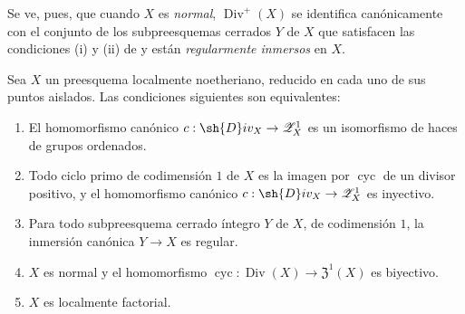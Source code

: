 \begin{env}[21.7.3.1]
\label{IV.21.7.3.1}
Se ve, pues, que cuando $X$ es \emph{normal}, $\operatorname{Div}^+(X)$ se identifica canónicamente con el conjunto de los subpreesquemas cerrados $Y$ de $X$ que satisfacen las condiciones (i) y (ii) de  y están \emph{regularmente inmersos} en $X$.
\end{env}

\begin{proposition}[21.7.4]
\label{IV.21.7.4}
Sea $X$ un preesquema localmente noetheriano, reducido en cada uno de sus puntos aislados.
Las condiciones siguientes son equivalentes:
\begin{enumerate}
  \item[\emph{a)}] El homomorfismo canónico $c:\sh{D}iv_X\to\mathscr{Z}_X^1$  es un isomorfismo de haces de grupos ordenados.
  \item[\emph{a$'$)}] Todo ciclo primo de codimensión $1$ de $X$ es la imagen por $\operatorname{cyc}$ de un divisor positivo, y el homomorfismo canónico $c:\sh{D}iv_X\to\mathscr{Z}_X^1$ es inyectivo.
  \item[\emph{a$''$)}] Para todo subpreesquema cerrado íntegro $Y$ de $X$, de codimensión $1$, la inmersión canónica $Y\to X$ es regular.
  \item[\emph{b)}] $X$ es normal y el homomorfismo $\operatorname{cyc}:\operatorname{Div}(X)\to\mathfrak{Z}^1(X)$ es biyectivo.
  \item[\emph{c)}] $X$ es localmente factorial.
\end{enumerate}
\end{proposition}

